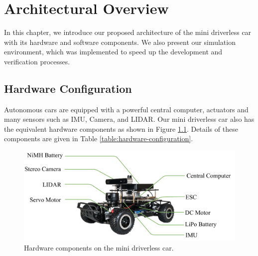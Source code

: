 \chapter{Architectural Overview}
\label{chp:b3}

In this chapter, we introduce our proposed architecture of the mini driverless
car with its hardware and software components. We also present our simulation
environment, which was implemented to speed up the development and
verification processes.

\section{Hardware Configuration}

Autonomous cars are equipped with a powerful central computer, actuators and
many sensors such as IMU, Camera, and LIDAR. Our mini driverless car also has
the equivalent hardware components as shown in Figure
\ref{figure:hardware-configuration}. Details of these components are given in
Table \ref{table:hardware-configuration}.

\begin{figure}[h]
  \centering
  \includegraphics[width=.8\textwidth]{figures/hardware-configuration.pdf}
  \caption{Hardware components on the mini driverless car.}
  \label{figure:hardware-configuration}
\end{figure}


